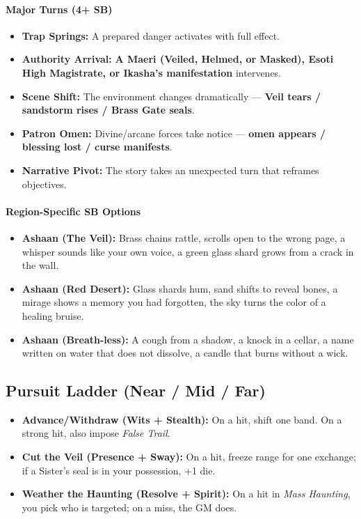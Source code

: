 \paragraph{Major Turns (4+ SB)}
\begin{itemize}
\item \textbf{Trap Springs:} A prepared danger activates with full effect.
\item \textbf{Authority Arrival:} \textbf{A Maeri (Veiled, Helmed, or Masked), Esoti High Magistrate, or Ikasha's manifestation} intervenes.
\item \textbf{Scene Shift:} The environment changes dramatically --- \textbf{Veil tears / sandstorm rises / Brass Gate seals}.
\item \textbf{Patron Omen:} Divine/arcane forces take notice --- \textbf{omen appears / blessing lost / curse manifests}.
\item \textbf{Narrative Pivot:} The story takes an unexpected turn that reframes objectives.
\end{itemize}

\paragraph{Region-Specific SB Options}
\begin{itemize}
\item \textbf{Ashaan (The Veil):} Brass chains rattle, scrolls open to the wrong page, a whisper sounds like your own voice, a green glass shard grows from a crack in the wall.
\item \textbf{Ashaan (Red Desert):} Glass shards hum, sand shifts to reveal bones, a mirage shows a memory you had forgotten, the sky turns the color of a healing bruise.
\item \textbf{Ashaan (Breath-less):} A cough from a shadow, a knock in a cellar, a name written on water that does not dissolve, a candle that burns without a wick.
\end{itemize}

\subsection*{Pursuit Ladder (Near / Mid / Far)}
\begin{itemize}
\item \textbf{Advance/Withdraw (Wits + Stealth):} On a hit, shift one band. On a strong hit, also impose \emph{False Trail}.
\item \textbf{Cut the Veil (Presence + Sway):} On a hit, freeze range for one exchange; if a Sister's seal is in your possession, +1 die.
\item \textbf{Weather the Haunting (Resolve + Spirit):} On a hit in \emph{Mass Haunting}, you pick who is targeted; on a miss, the GM does.
\end{itemize}

